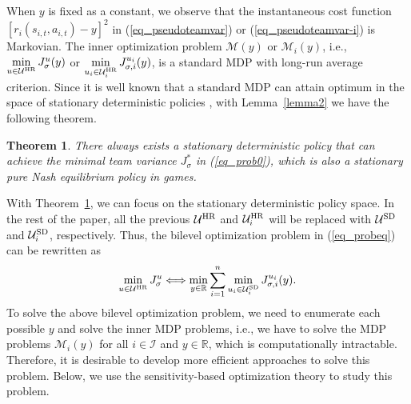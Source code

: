 \documentclass[12pt]{article}
\newtheorem{theorem}{Theorem}
\begin{document}
When $y$ is fixed as a constant, we observe that the instantaneous
cost function $[r_i(s_{i,t},a_{i,t})-y]^2$ in
(\ref{eq_pseudoteamvar}) or (\ref{eq_pseudoteamvar-i}) is Markovian.
The inner optimization problem $\mathcal M(y)$ or $\mathcal M_i(y)$,
i.e., $\min\limits_{u \in \mathcal U^{\rm HR}} J^u_{\sigma}(y)$ or
$\min\limits_{u_i \in \mathcal U^{\rm HR}_i} J^{u_i}_{\sigma,i}(y)$,
is a standard MDP with long-run average criterion. Since it is well
known that a standard MDP can attain optimum in the space of
stationary deterministic policies \citep{Puterman94}, with
Lemma~\ref{lemma2} we have the following theorem.

\begin{theorem}\label{theorem2}
There always exists a stationary deterministic policy that can
achieve the minimal team variance $J^*_{\sigma}$ in
(\ref{eq_prob0}), which is also a stationary pure Nash equilibrium
policy in games.
\end{theorem}

With Theorem~\ref{theorem2}, we can focus on the stationary
deterministic policy space. In the rest of the paper, all the
previous $\mathcal U^{\rm HR}$ and $\mathcal U^{\rm HR}_i$ will be
replaced with $\mathcal U^{\rm SD}$ and $\mathcal U^{\rm SD}_i$,
respectively. Thus, the bilevel optimization problem in
(\ref{eq_probeq}) can be rewritten as
\begin{equation}\label{eq_bilevelprob2}
\min_{u \in \mathcal U^{\rm HR}} J^{u}_{\sigma} \Longleftrightarrow
\min_{y \in \mathbb R} \sum_{i=1}^{n}\min_{u_i \in \mathcal U^{\rm
SD}_i} J^{u_i}_{\sigma,i}(y).
\end{equation}
To solve the above bilevel optimization problem, we need to
enumerate each possible $y$ and solve the inner MDP problems, i.e.,
we have to solve the MDP problems $\mathcal M_i(y)$ for all $i \in
\mathcal I$ and $y \in \mathbb R$, which is computationally
intractable. Therefore, it is desirable to develop more efficient
approaches to solve this problem. Below, we use the
sensitivity-based optimization theory \citep{Cao07} to study this
problem.
\end{document}
